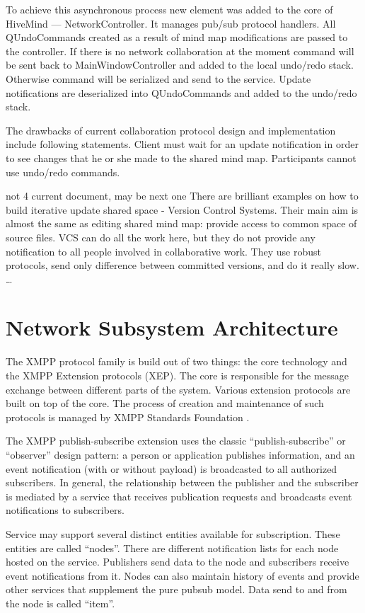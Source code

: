  To achieve this asynchronous process new element was added to the core of
 HiveMind --- NetworkController. It manages pub/sub protocol handlers. All
 QUndoCommands created as a result of mind map modifications are passed to the
 controller. If there is no network collaboration at the moment command will be
 sent back to MainWindowController and added to the local undo/redo stack.
 Otherwise command will be serialized and send to the service. Update
 notifications are deserialized into QUndoCommands and added to the undo/redo
 stack.

 The drawbacks of current collaboration protocol design and implementation
 include following statements. Client must wait for an update notification in
 order to see changes that he or she made to the shared mind map. Participants
 cannot use undo/redo commands.

 not 4 current document, may be next one
 There are brilliant examples on how to build iterative update shared space -
 Version Control Systems. Their main aim is almost the same as editing shared
 mind map: provide access to common space of source files. VCS can do all the 
 work here, but they do not provide any notification to all people involved in
 collaborative work. They use robust protocols, send only difference between
 committed versions, and do it really slow. \ldots

\section{Network Subsystem Architecture}

The XMPP protocol family is build out of two things: the core technology and the
XMPP Extension protocols (XEP). The core is responsible for the message exchange
between different parts of the system. Various extension protocols are built on
top of the core. The process of creation and maintenance of such protocols is
managed by XMPP Standards Foundation \cite{xmpp-standarts}.

The XMPP publish-subscribe extension \cite{xep-0060} uses the classic
``publish-subscribe'' or ``observer'' design pattern: a person or application
publishes information, and an event notification (with or without payload) is
broadcasted to all authorized subscribers. In general, the relationship between
the publisher and the subscriber is mediated by a service that receives
publication requests and broadcasts event notifications to subscribers.

Service may support several distinct entities available for subscription. These
entities are called ``nodes''. There are different notification lists for each
node hosted on the service. Publishers send data to the node and subscribers
receive event notifications from it. Nodes can also maintain history of events
and provide other services that supplement the pure pubsub model. Data send to
and from the node is called ``item''.

